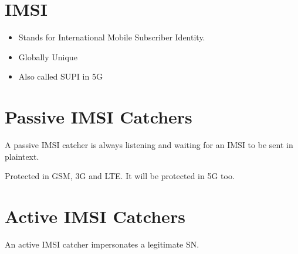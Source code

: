 \documentclass[portrait,a0]{a0poster}
\begin{document}
\begin{multicols}{2} %

\section{IMSI}

\begin{Large}
 
\end{Large}


\begin{itemize} \Large
 \item Stands for International Mobile Subscriber Identity.
 \item Globally Unique
 \item Also called SUPI in 5G
\end{itemize}

\vspace{30pt}

\begin{center}
    
\end{center}




\section{Passive IMSI Catchers}

\begin{Large}
A passive IMSI catcher is always listening and waiting for an IMSI to be sent in plaintext.
\end{Large}

\begin{center}
    
\end{center}

\begin{Large} Protected in GSM, 3G and LTE. It will be protected in 5G too. \end{Large}
                                                                                                                                                                     


\section{Active IMSI Catchers}
\begin{Large}
An active IMSI catcher impersonates a legitimate SN.
\end{Large}


\end{multicols}
\end{document}
